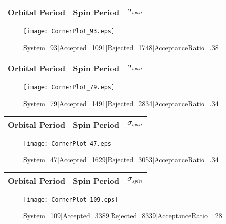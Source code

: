 \documentclass[10pt]{article}
\begin{document}
\begin{center}
        \begin{tabular}{|c|c|c|}
        \hline
Orbital Period & Spin Period & $\sigma_{spin}$ \\
 \hline
        \end{tabular}
        \end{center}
\begin{figure}[h] 
        \texttt{[image: CornerPlot\_93.eps]}
        \caption{System=93|Accepted=1091|Rejected=1748|AcceptanceRatio=.38}
        \label{S93}
        \centering
        \end{figure}
\begin{center}
        \begin{tabular}{|c|c|c|}
        \hline
Orbital Period & Spin Period & $\sigma_{spin}$ \\
 \hline
        \end{tabular}
        \end{center}
\begin{figure}[h] 
        \texttt{[image: CornerPlot\_79.eps]}
        \caption{System=79|Accepted=1491|Rejected=2834|AcceptanceRatio=.34}
        \label{S79}
        \centering
        \end{figure}
\begin{center}
        \begin{tabular}{|c|c|c|}
        \hline
Orbital Period & Spin Period & $\sigma_{spin}$ \\
 \hline
        \end{tabular}
        \end{center}
\begin{figure}[h] 
        \texttt{[image: CornerPlot\_47.eps]}
        \caption{System=47|Accepted=1629|Rejected=3053|AcceptanceRatio=.34}
        \label{S47}
        \centering
        \end{figure}
\begin{center}
        \begin{tabular}{|c|c|c|}
        \hline
Orbital Period & Spin Period & $\sigma_{spin}$ \\
 \hline
        \end{tabular}
        \end{center}
\begin{figure}[h] 
        \texttt{[image: CornerPlot\_109.eps]}
        \caption{System=109|Accepted=3389|Rejected=8339|AcceptanceRatio=.28}
        \label{S109}
        \centering
        \end{figure}
\end{document}
